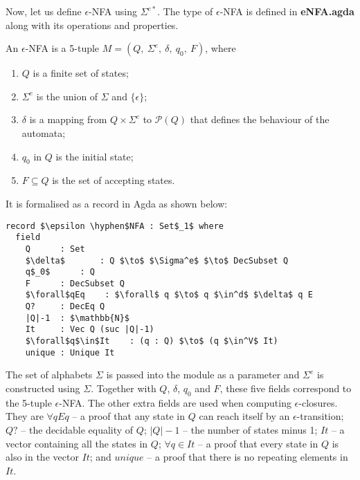 \par Now, let us define \(\epsilon\)-NFA using \(\Sigma^{e*}\). The
type of \(\epsilon\)-NFA is defined in \textbf{eNFA.agda} along with its operations and
properties. 

\begin{defn}
\noindent An \(\epsilon\)-NFA is a 5-tuple \(M = (Q
,\ \Sigma^e,\ \delta,\ q_0,\ F)\), where
\begin{enumerate}[nolistsep]
  \item \(Q\) is a finite set of states;
  \item \(\Sigma^e\) is the union of \(\Sigma\) and \(\{\epsilon\}\);
  \item \(\delta\) is a mapping from \(Q \times \Sigma^e\) to
    \(\mathcal P \left({Q}\right)\) that defines the behaviour of the automata;
  \item \(q_0\) in \(Q\) is the initial state;
  \item \(F \subseteq Q\) is the set of accepting states. 
\end{enumerate}
\end{defn}

\par It is formalised as a record in Agda as shown below: 

\begin{lstlisting}[mathescape=true,xleftmargin=.25\textwidth]
record $\epsilon \hyphen$NFA : Set$_1$ where
  field
    Q      : Set
    $\delta$       : Q $\to$ $\Sigma^e$ $\to$ DecSubset Q
    q$_0$      : Q
    F      : DecSubset Q
    $\forall$qEq    : $\forall$ q $\to$ q $\in^d$ $\delta$ q E
    Q?     : DecEq Q
    |Q|-1  : $\mathbb{N}$
    It     : Vec Q (suc |Q|-1)
    $\forall$q$\in$It    : (q : Q) $\to$ (q $\in^V$ It)
    unique : Unique It
\end{lstlisting}

\par The set of alphabets \(\Sigma\) is passed into the module as a
parameter and \(\Sigma^e\) is constructed using \(\Sigma\). Together with \(Q\), \(\delta\),
\(q_0\) and \(F\), these five fields correspond to the 5-tuple
\(\epsilon\)-NFA. The other extra fields are used when computing
\(\epsilon\)-closures. They are \(\forall qEq\) -- a proof that any
state in \(Q\) can reach itself by an
\(\epsilon\)-transition; \(Q?\) -- the decidable equality of \(Q\);
\(|Q|-1\) -- the number of states minus 1; \(It\) -- a vector
containing all the states in \(Q\); \(\forall q\in It\)
-- a proof that every state in \(Q\) is also in the vector
\(It\); and \(unique\) -- a proof that there is no repeating elements in
\(It\). 

